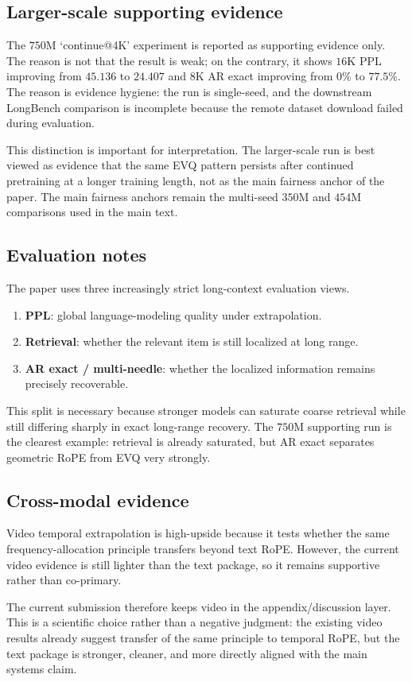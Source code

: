 \subsection{Larger-scale supporting evidence}

The \(750\mathrm{M}\) `continue@4K' experiment is reported as supporting evidence only. The reason is not that the result is weak; on the contrary, it shows \(16\mathrm{K}\) PPL improving from \(45.136\) to \(24.407\) and \(8\mathrm{K}\) AR exact improving from \(0\%\) to \(77.5\%\). The reason is evidence hygiene: the run is single-seed, and the downstream LongBench comparison is incomplete because the remote dataset download failed during evaluation.

This distinction is important for interpretation. The larger-scale run is best viewed as evidence that the same EVQ pattern persists after continued pretraining at a longer training length, not as the main fairness anchor of the paper. The main fairness anchors remain the multi-seed \(350\mathrm{M}\) and \(454\mathrm{M}\) comparisons used in the main text.

\subsection{Evaluation notes}

The paper uses three increasingly strict long-context evaluation views.
\begin{enumerate}
\item \textbf{PPL}: global language-modeling quality under extrapolation.
\item \textbf{Retrieval}: whether the relevant item is still localized at long range.
\item \textbf{AR exact / multi-needle}: whether the localized information remains precisely recoverable.
\end{enumerate}

This split is necessary because stronger models can saturate coarse retrieval while still differing sharply in exact long-range recovery. The \(750\mathrm{M}\) supporting run is the clearest example: retrieval is already saturated, but AR exact separates geometric RoPE from EVQ very strongly.

\subsection{Cross-modal evidence}

Video temporal extrapolation is high-upside because it tests whether the same frequency-allocation principle transfers beyond text RoPE. However, the current video evidence is still lighter than the text package, so it remains supportive rather than co-primary.

The current submission therefore keeps video in the appendix/discussion layer. This is a scientific choice rather than a negative judgment: the existing video results already suggest transfer of the same principle to temporal RoPE, but the text package is stronger, cleaner, and more directly aligned with the main systems claim.
